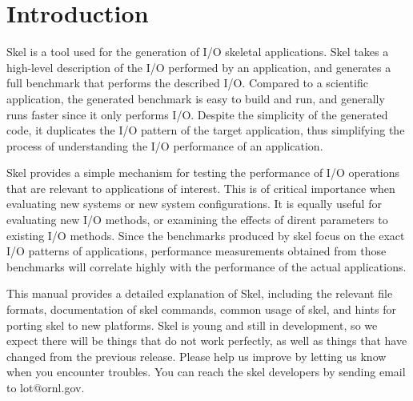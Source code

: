\chapter{Introduction}

Skel is a tool used for the generation of I/O skeletal applications. Skel takes a
high-level description of the I/O performed by an application, and generates a full
benchmark that performs the described I/O.
Compared to a scientific application, the generated benchmark is easy to build
and run, and generally runs faster since it only performs I/O. Despite
the simplicity of the generated code, it duplicates
the I/O pattern of the target application, thus simplifying the process of
understanding the I/O performance of an application.

Skel provides a simple mechanism for testing the performance of I/O operations
that are relevant to applications of interest. This is of critical importance
when evaluating new systems or new system configurations. It is equally useful
for evaluating new I/O methods, or examining the effects of dirent parameters
to existing I/O methods. Since the benchmarks produced by skel focus
on the exact I/O patterns of applications, performance measurements obtained
from those benchmarks will correlate highly with the performance of the actual
applications.

This manual provides a detailed explanation of Skel, including the relevant
file formats, documentation of skel commands, common usage of skel, and hints
for porting skel to new platforms. Skel is young and still in development, so we
expect there will be things that do not work perfectly, as well as things that 
have changed from the previous release. Please help us improve by
letting us know when you encounter troubles. You can reach the skel developers
by sending email to lot@ornl.gov.


